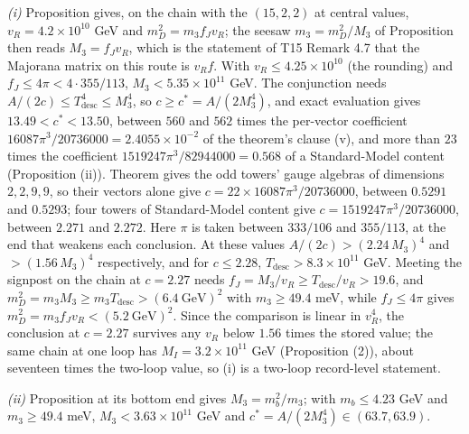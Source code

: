 \emph{(i)} Proposition  gives, on the chain with the $(15,2,2)$ at central values, $v_{R} = 4.2 \times 10^{10}$ GeV and $m_{D}^{2} = m_{3}f_{J}v_{R}$; the seesaw $m_{3} = m_{D}^{2}/M_{3}$ of Proposition  then reads $M_{3} = f_{J}v_{R}$, which is the statement of T15 Remark 4.7 that the Majorana matrix on this route is $v_{R}f$. With $v_{R} \le 4.25 \times 10^{10}$ (the rounding) and $f_{J} \le 4\pi < 4 \cdot 355/113$, $M_{3} < 5.35 \times 10^{11}$ GeV. The conjunction needs $A/(2c) \le T_{\mathrm{desc}}^{4} \le M_{3}^{4}$, so $c \ge c^{*} = A/(2M_{3}^{4})$, and exact evaluation gives $13.49 < c^{*} < 13.50$, between $560$ and $562$ times the per-vector coefficient $16087\pi^{3}/20736000 = 2.4055 \times 10^{-2}$ of the theorem's clause (v), and more than $23$ times the coefficient $1519247\pi^{3}/82944000 = 0.568$ of a Standard-Model content (Proposition (ii)). Theorem  gives the odd towers' gauge algebras of dimensions $2, 2, 9, 9$, so their vectors alone give $c = 22 \times 16087\pi^{3}/20736000$, between $0.5291$ and $0.5293$; four towers of Standard-Model content give $c = 1519247\pi^{3}/20736000$, between $2.271$ and $2.272$. Here $\pi$ is taken between $333/106$ and $355/113$, at the end that weakens each conclusion. At these values $A/(2c) > (2.24\,M_{3})^{4}$ and $> (1.56\,M_{3})^{4}$ respectively, and for $c \le 2.28$, $T_{\mathrm{desc}} > 8.3 \times 10^{11}$ GeV. Meeting the signpost on the chain at $c = 2.27$ needs $f_{J} = M_{3}/v_{R} \ge T_{\mathrm{desc}}/v_{R} > 19.6$, and $m_{D}^{2} = m_{3}M_{3} \ge m_{3}T_{\mathrm{desc}} > (6.4\ \mathrm{GeV})^{2}$ with $m_{3} \ge 49.4$ meV, while $f_{J} \le 4\pi$ gives $m_{D}^{2} = m_{3}f_{J}v_{R} < (5.2\ \mathrm{GeV})^{2}$. Since the comparison is linear in $v_{R}^{4}$, the conclusion at $c = 2.27$ survives any $v_{R}$ below $1.56$ times the stored value; the same chain at one loop has $M_{I} = 3.2 \times 10^{11}$ GeV (Proposition (2)), about seventeen times the two-loop value, so (i) is a two-loop record-level statement.

\emph{(ii)} Proposition  at its bottom end gives $M_{3} = m_{b}^{2}/m_{3}$; with $m_{b} \le 4.23$ GeV and $m_{3} \ge 49.4$ meV, $M_{3} < 3.63 \times 10^{11}$ GeV and $c^{*} = A/(2M_{3}^{4}) \in (63.7, 63.9)$.

